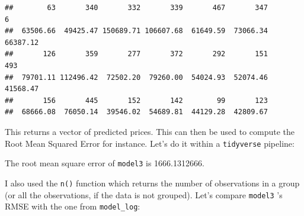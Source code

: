 \documentclass[]{gitbook}
\newenvironment{Shaded}{\begin{snugshade}}{\end{snugshade}}
\newcommand{\DataTypeTok}[1]{\textcolor[rgb]{0.13,0.29,0.53}{#1}}
\newcommand{\DecValTok}[1]{\textcolor[rgb]{0.00,0.00,0.81}{#1}}
\newcommand{\KeywordTok}[1]{\textcolor[rgb]{0.13,0.29,0.53}{\textbf{#1}}}
\newcommand{\NormalTok}[1]{#1}
\newcommand{\OperatorTok}[1]{\textcolor[rgb]{0.81,0.36,0.00}{\textbf{#1}}}
\newcommand{\StringTok}[1]{\textcolor[rgb]{0.31,0.60,0.02}{#1}}
\theoremstyle{definition}
\theoremstyle{definition}
\theoremstyle{definition}
\theoremstyle{remark}
\begin{document}
\begin{verbatim}
##        63       340       332       339       467       347         6 
##  63506.66  49425.47 150689.71 106607.68  61649.59  73066.34  66387.12 
##       126       359       277       372       292       151       493 
##  79701.11 112496.42  72502.20  79260.00  54024.93  52074.46  41568.47 
##       156       445       152       142        99       123 
##  68666.08  76050.14  39546.02  54689.81  44129.28  42809.67
\end{verbatim}

This returns a vector of predicted prices. This can then be used to
compute the Root Mean Squared Error for instance. Let's do it within a
\texttt{tidyverse} pipeline:

\begin{Shaded}
\end{Shaded}

The root mean square error of \texttt{model3} is 1666.1312666.

I also used the \texttt{n()} function which returns the number of
observations in a group (or all the observations, if the data is not
grouped). Let's compare \texttt{model3} 's RMSE with the one from
\texttt{model\_log}:

\begin{Shaded}
\end{Shaded}
\end{document}
